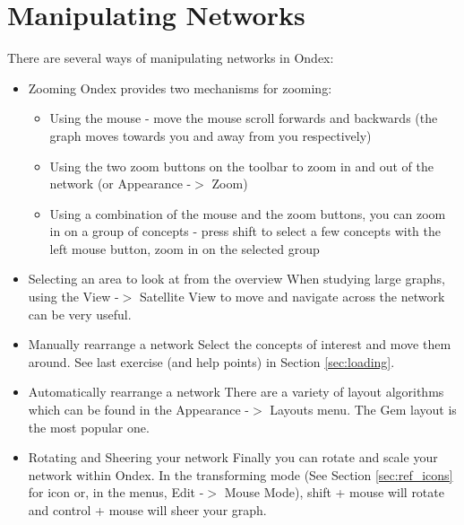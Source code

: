\section{Manipulating Networks}
\label{sec:ref_manipulating}

There are several ways of manipulating networks in Ondex:

\begin{itemize}

\item Zooming
Ondex provides two mechanisms for zooming:
\begin{itemize}
\item Using the mouse - move the mouse scroll forwards and backwards (the graph moves towards you and away from you respectively)
\item Using the two zoom buttons on the toolbar to zoom in and out of the network (or Appearance -$>$ Zoom)
\item Using a combination of the mouse and the zoom buttons, you can zoom in on a group of concepts -
press shift to select a few concepts with the left mouse button, zoom in on the selected group
\end{itemize}

\item Selecting an area to look at from the overview
When studying large graphs, using the View -$>$ Satellite View to move and navigate across the network can be very useful.

\item Manually rearrange a network
Select the concepts of interest and move them around. See last exercise (and help points) in Section \ref{sec:loading}.

\item Automatically rearrange a network
There are a variety of layout algorithms which can be found in the Appearance -$>$ Layouts menu. 
The Gem layout is the most popular one.

\item Rotating and Sheering your network
Finally you can rotate and scale your network within Ondex. 
In the transforming mode (See Section \ref{sec:ref_icons} for icon or, in the menus, Edit -$>$ Mouse Mode), 
shift + mouse will rotate and control + mouse will sheer your graph.
\end{itemize}


